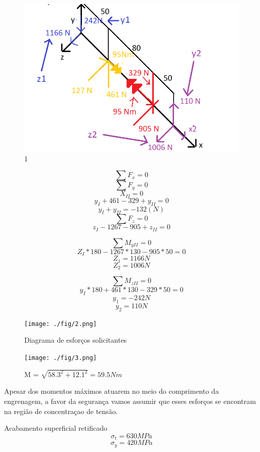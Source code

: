 \documentclass[a4paper, 12pt]{article}
\begin{document}
\begin{figure}[h]
\begin{center}
\includegraphics[scale=0.68]{./fig/1.png}
\caption{\label{fig:1}1} 
\end{center}
\end{figure}


\[\sum F_{x} = 0\]
\[\sum F_{y} = 0\]
\[X_{II}=0\]
\[y_{I}+461-329+y_{II}=0\]
\[y_{I}+y_{II}=-132 (N)\]
\[\sum F_{z} = 0\]
\[z_{I}-1267-905+z_{II}=0\]

\[\sum M_{yII} = 0\]
\[Z_{I}*180-1267*130-905*50=0\]
\[Z_{1}=1166 N\]
\[Z_{2}=1006 N\]

\[\sum M_{zII} = 0\]
\[y_{I}*180+461*130-329*50=0\]
\[y_{1}=-242 N\]
\[y_{2}=110 N\]

\begin{figure}[h]
\begin{center}
\texttt{[image: ./fig/2.png]}
\caption{\label{fig:2}Diagrama de esforços solicitantes} 
\end{center}
\end{figure}

\begin{figure}[h]
\begin{center}
\texttt{[image: ./fig/3.png]}
\caption{\label{fig:3}M = $\sqrt{58.3^{2}+12.1^{2}}=59.5Nm$} 
\end{center}
\end{figure}

Apesar dos momentos máximos atuarem no meio do comprimento da engrenagem, a favor da segurança vamos assumir que esses esforços se encontram na região de concentraçao de tensão.

 Acabamento superficial retificado
\[ \sigma _{t}  = 630 MPa\]
\[ \sigma _{y}  = 420 MPa\]
\end{document}
